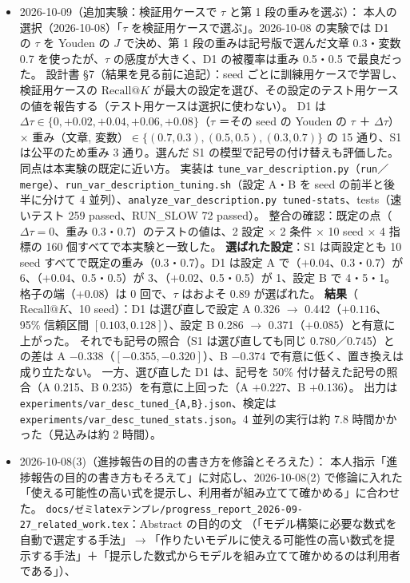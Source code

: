 \documentclass[11pt,a4paper]{jsarticle}
\begin{document}
\begin{itemize}[nosep]
  \item 2026-10-09（追加実験：検証用ケースで $\tau$ と第 1 段の重みを選ぶ）：
    本人の選択（2026-10-08）「$\tau$ を検証用ケースで選ぶ」。2026-10-08 の実験では D1 の $\tau$ を Youden の $J$ で決め、第 1 段の重みは記号版で選んだ文章 0.3・変数 0.7 を使ったが、$\tau$ の感度が大きく、D1 の被覆率は重み 0.5・0.5 で最良だった。
    設計書 \S7（結果を見る前に追記）：seed ごとに訓練用ケースで学習し、検証用ケースの $\textrm{Recall@}K$ が最大の設定を選び、その設定のテスト用ケースの値を報告する（テスト用ケースは選択に使わない）。
    D1 は $\Delta\tau \in \{0, +0.02, +0.04, +0.06, +0.08\}$（$\tau$ ＝その seed の Youden の $\tau$ ＋ $\Delta\tau$）× 重み（文章, 変数）$\in \{(0.7, 0.3), (0.5, 0.5), (0.3, 0.7)\}$ の 15 通り、S1 は公平のため重み 3 通り。選んだ S1 の模型で記号の付け替えも評価した。同点は本実験の既定に近い方。
    実装は \texttt{tune\_var\_description.py}（\texttt{run}／\texttt{merge}）、\texttt{run\_var\_description\_tuning.sh}（設定 A・B を seed の前半と後半に分けて 4 並列）、\texttt{analyze\_var\_description.py tuned-stats}、tests（速いテスト 259 passed、RUN\_SLOW 72 passed）。
    整合の確認：既定の点（$\Delta\tau=0$、重み 0.3・0.7）のテストの値は、2 設定 × 2 条件 × 10 seed × 4 指標の 160 個すべてで本実験と一致した。
    \textbf{選ばれた設定}：S1 は両設定とも 10 seed すべてで既定の重み（0.3・0.7）。D1 は設定 A で（$+0.04$、0.3・0.7）が 6、（$+0.04$、0.5・0.5）が 3、（$+0.02$、0.5・0.5）が 1、設定 B で 4・5・1。格子の端（$+0.08$）は 0 回で、$\tau$ はおよそ 0.89 が選ばれた。
    \textbf{結果}（$\textrm{Recall@}K$、10 seed）：D1 は選び直しで設定 A 0.326 $\to$ 0.442（$+0.116$、95\% 信頼区間 $[0.103, 0.128]$）、設定 B 0.286 $\to$ 0.371（$+0.085$）と有意に上がった。
    それでも記号の照合（S1 は選び直しても同じ 0.780／0.745）との差は A $-0.338$（$[-0.355, -0.320]$）、B $-0.374$ で有意に低く、置き換えは成り立たない。
    一方、選び直した D1 は、記号を 50\% 付け替えた記号の照合（A 0.215、B 0.235）を有意に上回った（A $+0.227$、B $+0.136$）。
    出力は \texttt{experiments/var\_desc\_tuned\_\{A,B\}.json}、検定は \texttt{experiments/var\_desc\_tuned\_stats.json}。4 並列の実行は約 7.8 時間かかった（見込みは約 2 時間）。
  \item 2026-10-08(3)（進捗報告の目的の書き方を修論とそろえた）：
    本人指示「進捗報告の目的の書き方もそろえて」に対応し、2026-10-08(2) で修論に入れた「使える可能性の高い式を提示し、利用者が組み立てて確かめる」に合わせた。
    \texttt{docs/ゼミlatexテンプレ/progress\_report\_2026-09-27\_related\_work.tex}：Abstract の目的の文
    （「モデル構築に必要な数式を自動で選定する手法」$\to$「作りたいモデルに使える可能性の高い数式を提示する手法」＋「提示した数式からモデルを組み立てて確かめるのは利用者である」）、

\end{itemize}
\end{document}
